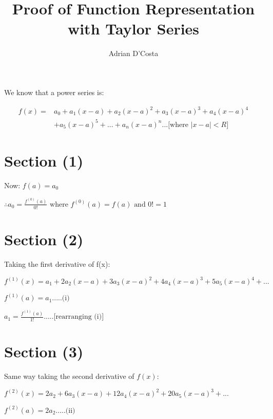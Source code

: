 \documentclass[14pt]{extreport}
\title{Proof of Function Representation with Taylor Series}
\author{Adrian D'Costa}
\begin{document}
\maketitle

We know that a power series is:
\newline

\begin{align*} f(x) =& a_0 + a_1(x-a) + a_2(x-a)^2 + a_3(x-a)^3 + a_4(x-a)^4 \\&+ a_5(x-a)^5 + ... + a_n(x-a)^{n}... \text{[where }\left|x-a\right| < R\text{]}\end{align*}
\newline

\section{Section (1)}
Now:
$f(a) = a_0$
\newline

$\therefore a_0 = \frac{f^{(0)}(a)}{0!} \text{ where } f^{(0)}(a) = f(a) \text{ and } 0! = 1$
\newline

\section{Section (2)}

Taking the first derivative of f(x):
\newline

$f^{(1)}(x) = a_1 + 2a_2(x-a) + 3a_3(x-a)^2 + 4a_4(x-a)^3 + 5a_5(x-a)^4 + ...$
\newline

$f^{(1)}(a) = a_1.....\text{(i)}$

$a_{1} = \frac{f^{(1)}(a)}{1!}.....\text{[rearranging (i)]}$
\newline
\newline

\section{Section (3)}

Same way taking the second derivative of $f(x)$:
\newline

$f^{(2)}(x) =  2a_2 + 6a_3(x-a) + 12a_4(x-a)^2 + 20a_5(x-a)^3 + ...$
\newline

$f^{(2)}(a) = 2a_2.....\text{(ii)}$
\newline
\end{document}
